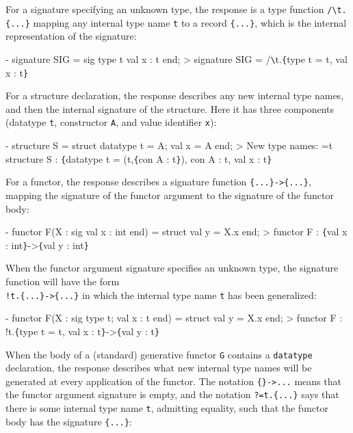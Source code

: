 \documentclass[fleqn,a4paper]{article}
\begin{document}
\noindent 
For a signature specifying an unknown type, the response is a type
function \verb+/\t.{...}+ mapping any internal type name \texttt{t} to
a record \verb+{...}+, which is the internal representation of the
signature:

\begin{program}
- signature SIG = sig type t val x : t end;
> signature SIG = /\verb+\+t.\verb+{+type t = t, val x : t\verb+}+
\end{program}

\noindent 
For a structure declaration, the response describes any new internal
type names, and then the internal signature of the structure.  Here it
has three components (datatype \texttt{t}, constructor \texttt{A}, and
value identifier \texttt{x}):

\begin{program}
- structure S = struct datatype t = A; val x = A end;
> New type names: =t
  structure S : \verb+{+datatype t = (t,\verb+{+con A : t\verb+}+), con A : t, val x : t\verb+}+
\end{program}

\noindent 
For a functor, the response describes a signature function
\verb+{...}->{...}+, mapping the signature of the functor argument to
the signature of the functor body:

\begin{program}
- functor F(X : sig val x : int end) = struct val y = X.x end;
> functor F : \verb+{+val x : int\verb+}+->\verb+{+val y : int\verb+}+
\end{program}

\noindent When the functor argument signature specifies an unknown
type, the signature function will have the form\\ \verb+!t.{...}->{...}+
in which the internal type name \texttt{t} has been generalized:

\begin{program}
- functor F(X : sig type t; val x : t end) = struct val y = X.x end;
> functor F : !t.\verb+{+type t = t, val x : t\verb+}+->\verb+{+val y : t\verb+}+
\end{program}

\noindent When the body of a (standard) generative functor \texttt{G}
contains a \texttt{datatype} declaration, the response describes what
new internal type names will be generated at every application of the
functor.  The notation \verb+{}->...+ means that the functor argument
signature is empty, and the notation \verb+?=t.{...}+ says that there
is some internal type name \verb+t+, admitting equality, such that
the functor body has the signature \verb+{...}+:
\end{document}
